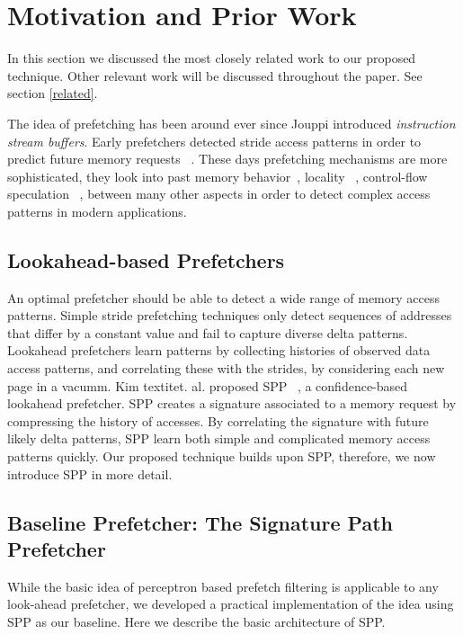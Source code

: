 \section{Motivation and Prior Work}
\label{Background}

In this section we discussed the most closely related work to our proposed technique. Other relevant work will be discussed throughout the paper. See section \ref{related}.

	The idea of prefetching has been around ever since Jouppi introduced \textit{instruction stream buffers}. Early prefetchers detected stride access patterns in order to predict future memory requests ~\cite{Smith,Baer,Stride}. These days prefetching mechanisms are more sophisticated, they look into past memory behavior~\cite{Address_Correlated,AMPM}, locality ~\cite{Spatial_Pattern,SMS,Temporal_Instruction_Fetch,Off_Chip,STMS,SMS_JILP}, control-flow speculation ~\cite{BFetch,MTBFetch}, between many other aspects in order to detect complex access patterns in modern applications.

\subsection{Lookahead-based Prefetchers}

An optimal prefetcher should be able to detect a wide range of memory access patterns. Simple stride prefetching techniques only detect sequences of addresses that differ by a constant value and fail to capture diverse delta patterns. Lookahead prefetchers learn patterns by collecting histories of observed data access patterns, and correlating these with the strides, by considering each new page in a vacumm. Kim textit{et. al.} proposed SPP ~\cite{SPP}, a confidence-based lookahead prefetcher. SPP creates a signature associated to a memory request by compressing the history of accesses. By correlating the signature with future likely delta patterns, SPP learn both simple and complicated memory access patterns quickly. Our proposed technique builds upon SPP, therefore, we now introduce SPP in more detail.  


\subsection{Baseline Prefetcher: The Signature Path Prefetcher}
\label{Background-SPP}

While the basic idea of perceptron based prefetch filtering is applicable to
any look-ahead prefetcher, we developed a practical implementation of the idea
using SPP as our baseline.  Here we describe the basic architecture of SPP.

